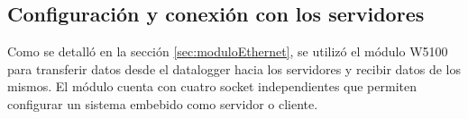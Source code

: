 


\subsection{Configuración y conexión con los servidores}\label{sec:confServers}
Como se detalló en la sección \ref{sec:moduloEthernet}, se utilizó el módulo W5100 para transferir datos desde el datalogger hacia los servidores y recibir datos de los mismos. El módulo cuenta con cuatro socket independientes que permiten configurar un sistema embebido como servidor o cliente.

